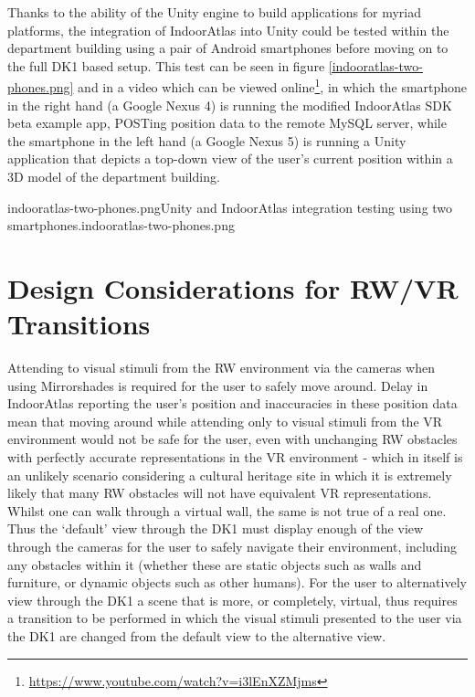 Thanks to the ability of the Unity engine to build applications for myriad platforms, the integration of IndoorAtlas into Unity could be tested within the department building using a pair of Android smartphones before moving on to the full DK1 based setup. This test can be seen in figure \ref{indooratlas-two-phones.png} and in a video which can be viewed online\footnote{\url{https://www.youtube.com/watch?v=i3lEnXZMjms}}, in which the smartphone in the right hand (a Google Nexus 4) is running the modified IndoorAtlas SDK beta example app, POSTing position data to the remote MySQL server, while the smartphone in the left hand (a Google Nexus 5) is running a Unity application that depicts a top-down view of the user's current position within a 3D model of the department building.

	   {indooratlas-two-phones.png}{Unity and IndoorAtlas integration testing using two smartphones.}{indooratlas-two-phones.png}
       


\section{Design Considerations for RW/VR Transitions}
\label{design-considerations-for-rw-vr-transitions}
Attending to visual stimuli from the RW environment via the cameras when using Mirrorshades is required for the user to safely move around. Delay in IndoorAtlas reporting the user's position and inaccuracies in these position data mean that moving around while attending only to visual stimuli from the VR environment would not be safe for the user, even with unchanging RW obstacles with perfectly accurate representations in the VR environment - which in itself is an unlikely scenario considering a cultural heritage site in which it is extremely likely that many RW obstacles will not have equivalent VR representations. Whilst one can walk through a virtual wall, the same is not true of a real one. Thus the `default' view through the DK1 must display enough of the view through the cameras for the user to safely navigate their environment, including any obstacles within it (whether these are static objects such as walls and furniture, or dynamic objects such as other humans). For the user to alternatively view through the DK1 a scene that is more, or completely, virtual, thus requires a transition to be performed in which the visual stimuli presented to the user via the DK1 are changed from the default view to the alternative view.

